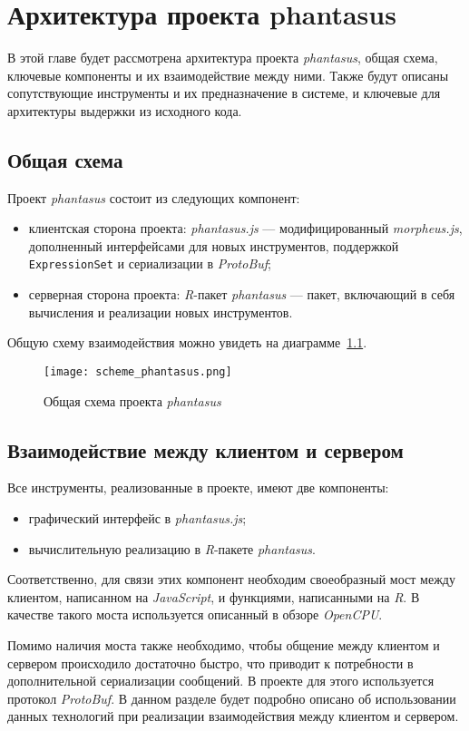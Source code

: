 \chapter{Архитектура проекта phantasus}
В этой главе будет рассмотрена архитектура проекта \emph{phantasus}, общая схема, ключевые компоненты и их взаимодействие между ними. Также будут описаны сопутствующие инструменты и их предназначение в системе, и ключевые для архитектуры выдержки из исходного кода.

\section{Общая схема}
Проект \emph{phantasus} состоит из следующих компонент:\begin{itemize}
\item клиентская сторона проекта: \emph{phantasus.js} --- модифицированный \emph{morpheus.js}, дополненный интерфейсами для новых инструментов, поддержкой \texttt{ExpressionSet} и сериализации в \emph{ProtoBuf};
\item серверная сторона проекта: \emph{R}-пакет \emph{phantasus} --- пакет, включающий в себя вычисления и реализации новых инструментов.\end{itemize}

Общую схему взаимодействия можно увидеть на диаграмме~\ref{scheme}.

\begin{figure}[!h]
  \caption{Общая схема проекта \emph{phantasus}}
  \texttt{[image: scheme\_phantasus.png]}
  \label{scheme}
\end{figure}

\section{Взаимодействие между клиентом и сервером}
Все инструменты, реализованные в проекте, имеют две компоненты:\begin{itemize}
\item графический интерфейс в \emph{phantasus.js};
\item вычислительную реализацию в \emph{R}-пакете \emph{phantasus}.
\end{itemize}

Соответственно, для связи этих компонент необходим своеобразный мост между клиентом, написанном на \emph{JavaScript}, и функциями, написанными на \emph{R}. В качестве такого моста используется описанный в обзоре \emph{OpenCPU}.

Помимо наличия моста также необходимо, чтобы общение между клиентом и сервером происходило достаточно быстро, что приводит к потребности в дополнительной сериализации сообщений. В проекте для этого используется протокол \emph{ProtoBuf}.
В данном разделе будет подробно описано об использовании данных технологий при реализации взаимодействия между клиентом и сервером.
